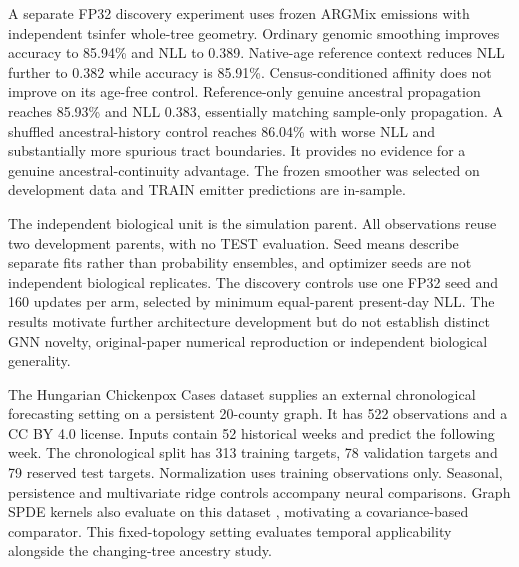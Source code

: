 \documentclass[letterpaper]{article}
\begin{document}
A separate FP32 discovery experiment uses frozen ARGMix emissions with independent tsinfer whole-tree geometry. Ordinary genomic smoothing improves accuracy to 85.94\% and NLL to 0.389. Native-age reference context reduces NLL further to 0.382 while accuracy is 85.91\%. Census-conditioned affinity does not improve on its age-free control. Reference-only genuine ancestral propagation reaches 85.93\% and NLL 0.383, essentially matching sample-only propagation. A shuffled ancestral-history control reaches 86.04\% with worse NLL and substantially more spurious tract boundaries. It provides no evidence for a genuine ancestral-continuity advantage. The frozen smoother was selected on development data and TRAIN emitter predictions are in-sample.

The independent biological unit is the simulation parent. All observations reuse two development parents, with no TEST evaluation. Seed means describe separate fits rather than probability ensembles, and optimizer seeds are not independent biological replicates. The discovery controls use one FP32 seed and 160 updates per arm, selected by minimum equal-parent present-day NLL. The results motivate further architecture development but do not establish distinct GNN novelty, original-paper numerical reproduction or independent biological generality.

The Hungarian Chickenpox Cases dataset supplies an external chronological forecasting setting on a persistent 20-county graph. It has 522 observations and a CC BY 4.0 license. Inputs contain 52 historical weeks and predict the following week. The chronological split has 313 training targets, 78 validation targets and 79 reserved test targets. Normalization uses training observations only. Seasonal, persistence and multivariate ridge controls accompany neural comparisons. Graph SPDE kernels also evaluate on this dataset \citep{graphspde2022}, motivating a covariance-based comparator. This fixed-topology setting evaluates temporal applicability alongside the changing-tree ancestry study.


\end{document}

